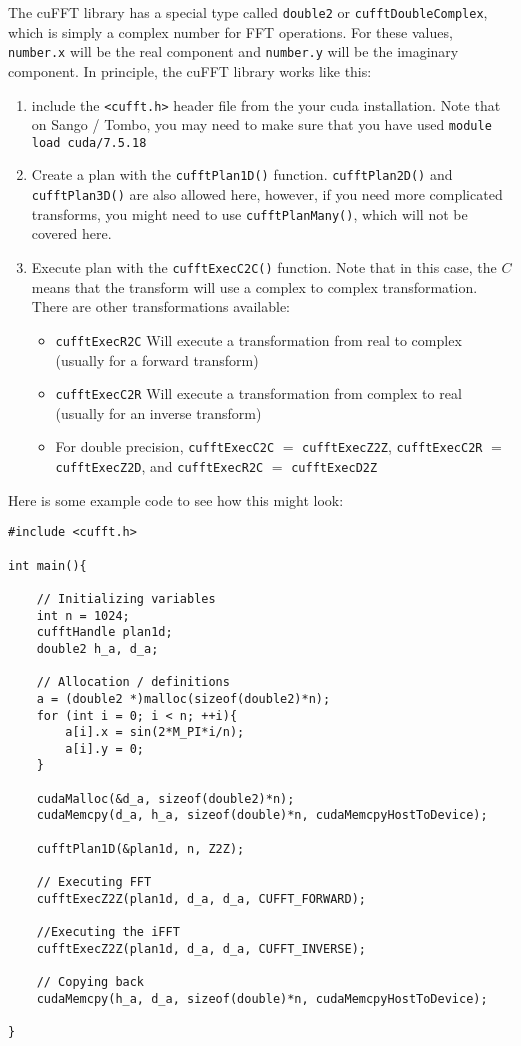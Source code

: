 \documentclass[11pt]{article}
\begin{document}
The cuFFT library has a special type called \lstinline{double2} or \lstinline{cufftDoubleComplex}, which is simply a complex number for FFT operations. For these values, \lstinline{number.x} will be the real component and \lstinline{number.y} will be the imaginary component. In principle, the cuFFT library works like this:
\begin{enumerate}
\item include the \lstinline{<cufft.h>} header file from the your cuda installation. Note that on Sango / Tombo, you may need to make sure that you have used \lstinline{module load cuda/7.5.18}
\item Create a plan with the \lstinline{cufftPlan1D()} function. \lstinline{cufftPlan2D()} and \lstinline{cufftPlan3D()} are also allowed here, however, if you need more complicated transforms, you might need to use \lstinline{cufftPlanMany()}, which will not be covered here.
\item Execute plan with the \lstinline{cufftExecC2C()} function. Note that in this case, the $C$ means that the transform will use a complex to complex transformation. There are other transformations available:
    \begin{itemize}
    \item \lstinline{cufftExecR2C} Will execute a transformation from real to complex (usually for a forward transform)
    \item \lstinline{cufftExecC2R} Will execute a transformation from complex to real (usually for an inverse transform)
    \item For double precision, \lstinline{cufftExecC2C} $=$ \lstinline{cufftExecZ2Z}, \lstinline{cufftExecC2R} $=$ \lstinline{cufftExecZ2D}, and \lstinline{cufftExecR2C} $=$ \lstinline{cufftExecD2Z}
    \end{itemize}
\end{enumerate}

Here is some example code to see how this might look:

\begin{lstlisting}
#include <cufft.h>

int main(){

    // Initializing variables
    int n = 1024;
    cufftHandle plan1d;
    double2 h_a, d_a;
    
    // Allocation / definitions
    a = (double2 *)malloc(sizeof(double2)*n);
    for (int i = 0; i < n; ++i){
        a[i].x = sin(2*M_PI*i/n);
        a[i].y = 0;
    }
    
    cudaMalloc(&d_a, sizeof(double2)*n);
    cudaMemcpy(d_a, h_a, sizeof(double)*n, cudaMemcpyHostToDevice);
    
    cufftPlan1D(&plan1d, n, Z2Z);
    
    // Executing FFT 
    cufftExecZ2Z(plan1d, d_a, d_a, CUFFT_FORWARD);
    
    //Executing the iFFT
    cufftExecZ2Z(plan1d, d_a, d_a, CUFFT_INVERSE);
    
    // Copying back
    cudaMemcpy(h_a, d_a, sizeof(double)*n, cudaMemcpyHostToDevice);

}
\end{lstlisting}
\end{document}
